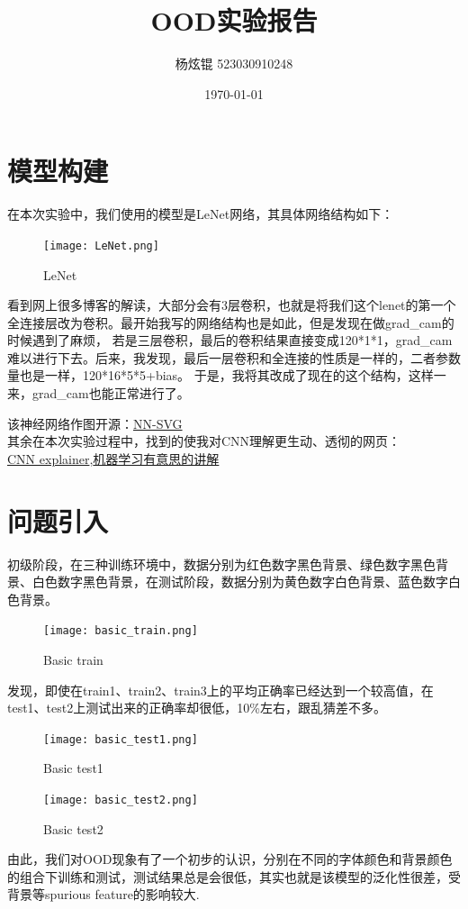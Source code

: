 \documentclass[12pt, a4paper, oneside]{ctexart}
\title{OOD实验报告}
\author{杨炫锟 523030910248}
\date{\today}
\begin{document}
\maketitle
\tableofcontents

\section{模型构建}

在本次实验中，我们使用的模型是LeNet网络，其具体网络结构如下：

\begin{figure}[H]
    \centering
    \texttt{[image: LeNet.png]}
    \caption{LeNet}
\end{figure}
看到网上很多博客的解读，大部分会有3层卷积，也就是将我们这个lenet的第一个全连接层改为卷积。最开始我写的网络结构也是如此，但是发现在做grad\_cam的时候遇到了麻烦，
若是三层卷积，最后的卷积结果直接变成120*1*1，grad\_cam难以进行下去。后来，我发现，最后一层卷积和全连接的性质是一样的，二者参数量也是一样，120*16*5*5+bias。
于是，我将其改成了现在的这个结构，这样一来，grad\_cam也能正常进行了。

该神经网络作图开源：\href{https://alexlenail.me/NN-SVG/LeNet.html}{NN-SVG}\\
其余在本次实验过程中，找到的使我对CNN理解更生动、透彻的网页：\\
\href{https://poloclub.github.io/cnn-explainer/}{CNN explainer},\href{https://www.ruder.io/}{机器学习有意思的讲解}

\section{问题引入}
初级阶段，在三种训练环境中，数据分别为红色数字黑色背景、绿色数字黑色背景、白色数字黑色背景，在测试阶段，数据分别为黄色数字白色背景、蓝色数字白色背景。
\begin{figure}[H]
    \centering
    \texttt{[image: basic\_train.png]}
    \caption{Basic train}
\end{figure}
发现，即使在train1、train2、train3上的平均正确率已经达到一个较高值，在test1、test2上测试出来的正确率却很低，10\%左右，跟乱猜差不多。
\begin{figure}[H]  
    \begin{minipage}[H]{0.5\linewidth} %
            \centering
            \texttt{[image: basic\_test1.png]}
            \caption{Basic test1}
     \end{minipage}
     \begin{minipage}[H]{0.5\linewidth} %
         \hspace{2mm}%
         \texttt{[image: basic\_test2.png]}
         \caption{Basic test2}
      \end{minipage}
\end{figure}
由此，我们对OOD现象有了一个初步的认识，分别在不同的字体颜色和背景颜色的组合下训练和测试，测试结果总是会很低，其实也就是该模型的泛化性很差，受背景等spurious feature的影响较大.
\end{document}
